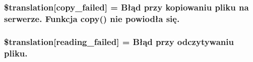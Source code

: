 \subsubsection[{\$translation}]{\setlength{\rightskip}{0pt plus 5cm}\$translation\mbox{[}\textquotesingle{}copy\+\_\+failed\textquotesingle{}\mbox{]} = \textquotesingle{}Błąd przy kopiowaniu pliku na serwerze. Funkcja copy() nie powiodła się.\textquotesingle{}}\label{class_8upload_8pl___p_l_8php_a783c9358bcf54a054545b50098bc679b}
\hypertarget{class_8upload_8pl___p_l_8php_a01bea14c9fd5f353f62db44beabfcd42}{}
\subsubsection[{\$translation}]{\setlength{\rightskip}{0pt plus 5cm}\$translation\mbox{[}\textquotesingle{}reading\+\_\+failed\textquotesingle{}\mbox{]} = \textquotesingle{}Błąd przy odczytywaniu pliku.\textquotesingle{}}\label{class_8upload_8pl___p_l_8php_a01bea14c9fd5f353f62db44beabfcd42}
